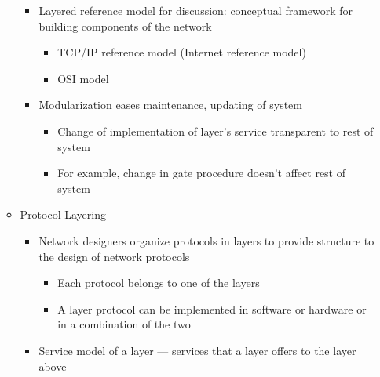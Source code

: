 \begin{itemize}
\begin{itemize}
\begin{itemize}
          \item Layered reference model for discussion: conceptual framework for building components of the network

            \begin{itemize}

              \item TCP/IP reference model (Internet reference model)

              \item OSI model

            \end{itemize}

          \item Modularization eases maintenance, updating of system

            \begin{itemize}

              \item Change of implementation of layer's service transparent to rest of system

              \item For example, change in gate procedure doesn't affect rest of system

            \end{itemize}

        \end{itemize}

      \item Protocol Layering

        \begin{itemize}

          \item Network designers organize protocols in layers to provide structure to the design of network protocols

            \begin{itemize}

              \item Each protocol belongs to one of the layers

              \item A layer protocol can be implemented in software or hardware or in a combination of the two

            \end{itemize}

          \item Service model of a layer — services that a layer offers to the layer above


\end{itemize}
\end{itemize}
\end{itemize}
